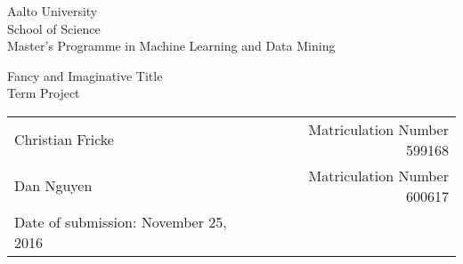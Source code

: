 \titlepage%

\vspace{2cm}
\parbox{7.3cm}{
  Aalto University \\
  School of Science \\
  Master's Programme in Machine Learning and Data Mining
}
\begin{center}
  \sffamily

  \vspace{3cm}
  \huge Fancy and Imaginative Title \\

  \vspace{3cm}
  \huge Term Project
\end{center}

\vspace{\fill}\normalsize

\begin{table}[h]
  \begin{tabular*}{1\textwidth}{@{\extracolsep{\fill}}lr}
    Christian Fricke                      & Matriculation Number 599168 \\
    Dan Nguyen                            & Matriculation Number 600617 \\
    Date of submission: November 25, 2016 & \\
  \end{tabular*}
\end{table}

